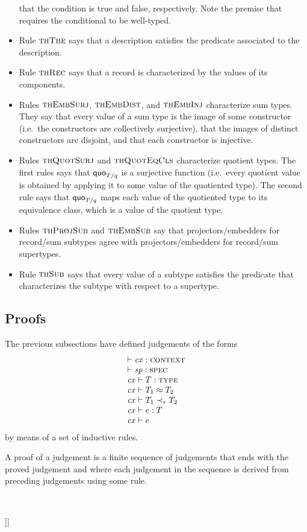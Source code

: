 \begin{itemize}
that the condition is true and false, respectively. Note the premise that
requires the conditional to be well-typed.
\item
Rule $\textsc{thThe}$ says that a description satisfies the predicate associated to
the description.
\item
Rule $\textsc{thRec}$ says that a record is characterized by the values of its
components.
\item
Rules $\textsc{thEmbSurj}$, $\textsc{thEmbDist}$, and $\textsc{thEmbInj}$ characterize sum types.
They say that every value of a sum type is the image of some constructor
(i.e.\ the constructors are collectively surjective), that the images of
distinct constructors are disjoint, and that each constructor is injective.
\item
Rules $\textsc{thQuotSurj}$ and $\textsc{thQuotEqCls}$ characterize quotient types. The
first rules says that $\mathsf{quo}_{T/q}$ is a surjective function (i.e.\ every quotient
value is obtained by applying it to some value of the quotiented type). The
second rule says that $\mathsf{quo}_{T/q}$ maps each value of the quotiented type to its
equivalence class, which is a value of the quotient type.
\item
Rules $\textsc{thProjSub}$ and $\textsc{thEmbSub}$ say that projectors/embedders for
record/sum subtypes agree with projectors/embedders for record/sum supertypes.
\item
Rule $\textsc{thSub}$ says that every value of a subtype satisfies the predicate that
characterizes the subtype with respect to a supertype.
\end{itemize}

\subsection{Proofs}

The previous subsections have defined judgements of the forms
\[
\begin{array}{l}
\vdash\mathit{cx}:\textsc{context} \\
\vdash\mathit{sp}:\textsc{spec} \\
\mathit{cx}\vdash T:\textsc{type} \\
\mathit{cx}\vdash T_1\approx T_2 \\
\mathit{cx}\vdash T_1\prec_{r}T_2 \\
\mathit{cx}\vdash e:T \\
\mathit{cx}\vdash e
\end{array}
\]
by means of a set of inductive rules.

A proof of a judgement is a finite sequence of judgements that ends with the
proved judgement and where each judgement in the sequence is derived from
preceding judgements using some rule.

\

\noindent
[[[TO DO: Make sure that the rules for theorems are ``sufficient'', i.e.\ all
truths ``of interest'' are indeed theorems derivable from the rules. Even
though higher-order logic is notoriously incomplete, in practice theorem
provers like PVS and HOL are sufficient to prove desired properties of
formalized concepts without running into theoretical limitations. Perhaps the
requirement boils down to prove completeness with respect to so-called
``general models'' (cf.\ \cite{andrews}).]]]
